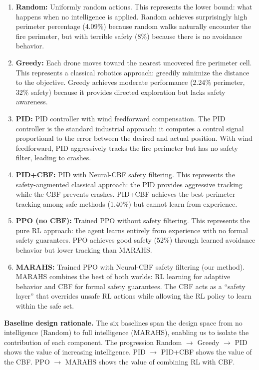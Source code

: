 \documentclass[12pt,a4paper]{article}
\begin{document}
\begin{enumerate}[leftmargin=*, label=\textbf{B\arabic*}]
    \item \textbf{Random:} Uniformly random actions. This represents the lower bound: what happens when no intelligence is applied. Random achieves surprisingly high perimeter percentage (4.09\%) because random walks naturally encounter the fire perimeter, but with terrible safety (8\%) because there is no avoidance behavior.
    
    \item \textbf{Greedy:} Each drone moves toward the nearest uncovered fire perimeter cell. This represents a classical robotics approach: greedily minimize the distance to the objective. Greedy achieves moderate performance (2.24\% perimeter, 32\% safety) because it provides directed exploration but lacks safety awareness.
    
    \item \textbf{PID:} PID controller with wind feedforward compensation. The PID controller is the standard industrial approach: it computes a control signal proportional to the error between the desired and actual position. With wind feedforward, PID aggressively tracks the fire perimeter but has no safety filter, leading to crashes.
    
    \item \textbf{PID+CBF:} PID with Neural-CBF safety filtering. This represents the safety-augmented classical approach: the PID provides aggressive tracking while the CBF prevents crashes. PID+CBF achieves the best perimeter tracking among safe methods (1.40\%) but cannot learn from experience.
    
    \item \textbf{PPO (no CBF):} Trained PPO without safety filtering. This represents the pure RL approach: the agent learns entirely from experience with no formal safety guarantees. PPO achieves good safety (52\%) through learned avoidance behavior but lower tracking than MARAHS.
    
    \item \textbf{MARAHS:} Trained PPO with Neural-CBF safety filtering (our method). MARAHS combines the best of both worlds: RL learning for adaptive behavior and CBF for formal safety guarantees. The CBF acts as a ``safety layer'' that overrides unsafe RL actions while allowing the RL policy to learn within the safe set.
\end{enumerate}

\textbf{Baseline design rationale.} The six baselines span the design space from no intelligence (Random) to full intelligence (MARAHS), enabling us to isolate the contribution of each component. The progression Random $\to$ Greedy $\to$ PID shows the value of increasing intelligence. PID $\to$ PID+CBF shows the value of the CBF. PPO $\to$ MARAHS shows the value of combining RL with CBF.
\end{document}
